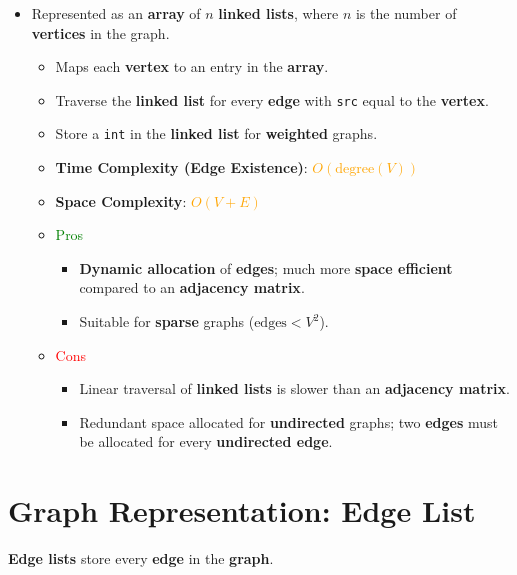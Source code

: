 \documentclass[12pt, letterpaper]{article}
\begin{document}
\begin{itemize}
    \item Represented as an \textbf{array} of $ n $ \textbf{linked lists}, where $ n $ is the number of \textbf{vertices} in the graph.
        \begin{itemize}
            \item Maps each \textbf{vertex} to an entry in the \textbf{array}.
            \item Traverse the \textbf{linked list} for every \textbf{edge} with \texttt{src} equal to the \textbf{vertex}.
            \item Store a \texttt{int} in the \textbf{linked list} for \textbf{weighted} graphs.
            \item \textbf{Time Complexity (Edge Existence)}: \textcolor{orange}{ $ O(\textrm{degree}(V)) $ }
            \item \textbf{Space Complexity}: \textcolor{orange}{ $ O(V + E) $ }
            \item \textcolor{green}{Pros}
                \begin{itemize}
                    \item \textbf{Dynamic allocation} of \textbf{edges}; much more \textbf{space efficient} compared to an \textbf{adjacency matrix}.
                    \item Suitable for \textbf{sparse} graphs ($ \textrm{edges} < V^2 $).
                \end{itemize}
            \item \textcolor{red}{Cons}
                \begin{itemize}
                    \item Linear traversal of \textbf{linked lists} is slower than an \textbf{adjacency matrix}.
                    \item Redundant space allocated for \textbf{undirected} graphs; two \textbf{edges} must be allocated for every \textbf{undirected edge}.
                \end{itemize}
        \end{itemize}
\end{itemize}

\section*{Graph Representation: Edge List}

\textbf{Edge lists} store every \textbf{edge} in the \textbf{graph}.
\end{document}
